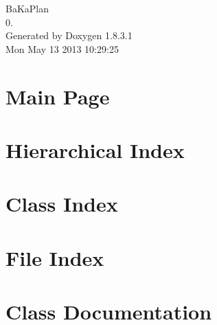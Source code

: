 \documentclass{book}
\begin{document}
\hypersetup{pageanchor=false,citecolor=blue}
\begin{titlepage}
\vspace*{7cm}
\begin{center}
{\Large Ba\-Ka\-Plan \\[1ex]\large 0. }\\
\vspace*{1cm}
{\large Generated by Doxygen 1.8.3.1}\\
\vspace*{0.5cm}
{\small Mon May 13 2013 10:29:25}\\
\end{center}
\end{titlepage}
\clearemptydoublepage
{}
\tableofcontents
\clearemptydoublepage
{}
\hypersetup{pageanchor=true,citecolor=blue}
\chapter{Main Page}
\label{index}\hypertarget{index}{}
\chapter{Hierarchical Index}

\chapter{Class Index}

\chapter{File Index}

\chapter{Class Documentation}




























\end{document}
